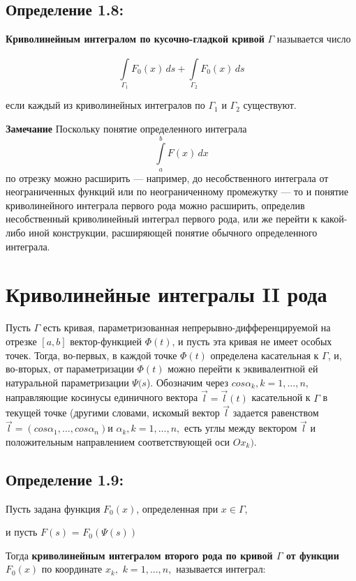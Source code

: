 \documentclass[12pt]{article}
\begin{document}
	
\subsection*{Определение 1.8:}	
\textbf{Криволинейным интегралом по кусочно-гладкой кривой} $\Gamma$ называется число

\begin{equation}\label{eq1}
\int\limits_{\Gamma_1}^{} F_0(x)\,ds  + \int\limits_{\Gamma_2}^{} F_0(x)\,ds
\end{equation}

если каждый из криволинейных интегралов по $\Gamma_1$ и $\Gamma_2$ существуют.
	
	
\textbf{Замечание} Поскольку понятие определенного интеграла
 $$\int\limits_{a}^{b} F(x)\,dx $$
по отрезку можно расширить — например, до несобственного интеграла от
неограниченных функций или по неограниченному промежутку — то и понятие криволинейного интеграла первого рода можно расширить, определив несобственный криволинейный интеграл первого рода, или же перейти
к какой-либо иной конструкции, расширяющей понятие обычного определенного интеграла.	
	\newpage	
	
\section{Криволинейные интегралы II рода}	
Пусть $\Gamma$ есть кривая, параметризованная непрерывно-дифференцируемой
на отрезке $[a, b]$ вектор-функцией $\Phi(t)$, и пусть эта кривая не имеет особых
точек. Тогда, во-первых, в каждой точке $\Phi(t)$ определена касательная к  $\Gamma$,
и, во-вторых, от параметризации $\Phi(t)$ можно перейти к эквивалентной ей
натуральной параметризации $\Psi(s$). Обозначим через $cos \alpha_k, k = 1,...,n,$
направляющие косинусы единичного вектора $\vec{l} = \vec{l}(t)$ касательной к $\Gamma$ в
текущей точке (другими словами, искомый вектор $\vec{l}$ задается равенством 
$\vec{l} = (cos \alpha_1,..., cos \alpha_n) $и $\alpha_k, k = 1,...,n,$ есть углы между вектором $\vec{l}$
и положительным направлением соответствующей оси $Ox_k)$. 

\subsection*{Определение 1.9:}	
	Пусть задана функция $F_0(x)$, определенная при $x \in \Gamma$, 

и пусть $ F(s)$ = $F_0(\Psi(s))$

Тогда \textbf{криволинейным интегралом второго рода по кривой $\Gamma$ от функции $F_0(x)$} по координате $x_k,$ $ k = 1,...,n,$ называется интеграл:
\end{document}
